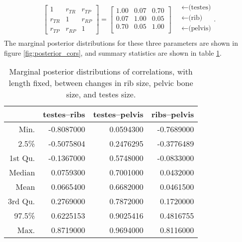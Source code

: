 \documentclass{article}
\begin{document}
\begin{align}
\begin{bmatrix}
  1 & r_{TR} & r_{TP} \\ 
  r_{TR} & 1 & r_{RP} \\ 
  r_{TP} & r_{RP} & 1 
 \end{bmatrix}
 =
\begin{bmatrix}
  1.00 & 0.07 & 0.70 \\ 
  0.07 & 1.00 & 0.05 \\ 
  0.70 & 0.05 & 1.00 \\ 
 \end{bmatrix}
\quad \begin{matrix}
  \leftarrow \text{(testes)} \\
  \leftarrow \text{(rib)} \\
  \leftarrow \text{(pelvis)} \\
\end{matrix}  .
\end{align}
The marginal posterior distributions for these three parameters
are shown in figure \ref{fig:posterior_cors},
and summary statistics are shown in table \ref{tab:posterior_cors}.

\begin{table}[ht]
\centering
\begin{tabular}{rrrr}
  \hline
        &  testes--ribs & testes--pelvis & ribs--pelvis \\
  \hline
 Min. &     -0.8087000  &   0.0594300 & -0.7689000   \\
 2.5\% &    -0.5075804  &   0.2476295 & -0.3776489   \\
 1st Qu. &  -0.1367000  &   0.5748000 & -0.0833000   \\
 Median &    0.0759300  &   0.7001000 &  0.0432000   \\
 Mean &      0.0665400  &   0.6682000 &  0.0461500   \\
 3rd Qu. &   0.2769000  &   0.7872000 &  0.1720000   \\
 97.5\%  &   0.6225153  &   0.9025416 &  0.4816755   \\
 Max. &      0.8719000  &   0.9694000 &  0.8116000   \\
   \hline
\end{tabular}
  \caption{Marginal posterior distributions of correlations, with length fixed,
  between changes in rib size, pelvic bone size, and testes size.
  \label{tab:posterior_cors}
}
\end{table}
\end{document}
